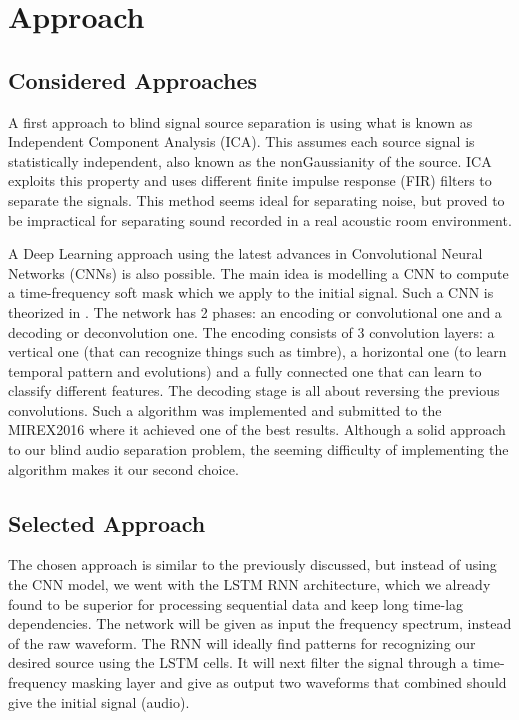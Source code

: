 \documentclass[../Thesis.tex]{subfiles}
\begin{document}
 
\section  {Approach}
\subsection {Considered Approaches}

A first approach to blind signal source separation is using what is known as Independent Component Analysis (ICA). This assumes each source signal is statistically independent, also known as the nonGaussianity of the source. ICA exploits this property and uses different finite impulse response (FIR) filters to separate the signals. This method seems ideal for separating noise, but proved to be impractical for separating sound recorded in a real acoustic room environment.

A Deep Learning approach using the latest advances in Convolutional Neural Networks (CNNs) is also possible. The main idea is modelling a CNN to compute a time-frequency soft mask which we apply to the initial signal. Such a CNN is theorized in \cite{pritish} . The network has 2 phases: an encoding or convolutional one and a decoding or deconvolution one. The encoding consists of 3 convolution layers: a vertical one (that can recognize things such as timbre), a horizontal one (to learn temporal pattern and evolutions) and a fully connected one that can learn to classify different features. The decoding stage is all about reversing the previous convolutions. Such a algorithm was implemented and submitted to the MIREX2016 where it achieved one of the best results. Although a solid approach to our blind audio separation problem, the seeming difficulty of implementing the algorithm makes it our second choice.  


\subsection {Selected Approach}

The chosen approach is similar to the previously discussed, but instead of using the CNN model, we went with the LSTM RNN architecture, which we already found to be superior for processing sequential data and keep long time-lag dependencies. The network will be given as input the frequency spectrum, instead of the raw waveform. The RNN will ideally find patterns for recognizing our desired source using the LSTM cells. It will next filter the signal through a time-frequency masking layer and give as output two waveforms that combined should give the initial signal (audio). 
\end{document}
